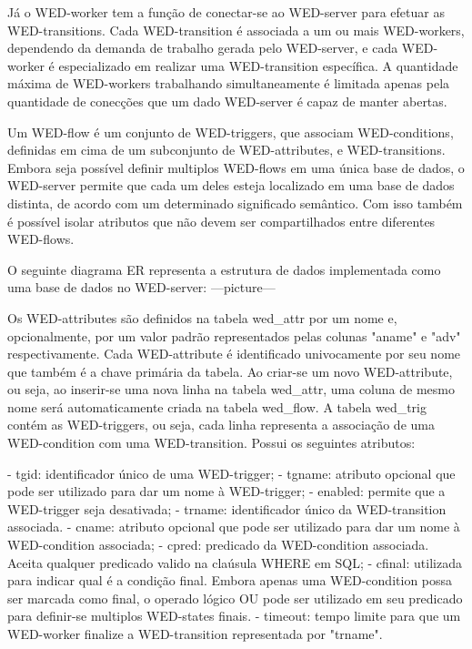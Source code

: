   Já o WED-worker tem a função de conectar-se ao WED-server para efetuar as WED-transitions. Cada WED-transition é associada
a um ou mais WED-workers, dependendo da demanda de trabalho gerada pelo WED-server, e cada WED-worker é especializado
em realizar uma WED-transition específica. A quantidade máxima de WED-workers trabalhando simultaneamente é limitada
apenas pela quantidade de conecções que um dado WED-server é capaz de manter abertas.
  
  Um WED-flow é um conjunto de WED-triggers, que associam WED-conditions, definidas em cima de 
um subconjunto de WED-attributes, e WED-transitions.
  Embora seja possível definir multiplos WED-flows em uma única base de dados, o WED-server permite que cada um deles 
esteja localizado em uma base de dados distinta, de acordo com um determinado significado semântico. Com isso também é 
possível isolar atributos que não devem ser compartilhados entre diferentes WED-flows. 
  
  O seguinte diagrama ER representa a estrutura de dados implementada como uma base de dados no WED-server:
  ---picture---

  Os WED-attributes são definidos na tabela wed_attr por um nome e, opcionalmente, por um valor padrão representados 
pelas colunas "aname" e "adv" respectivamente. Cada WED-attribute é identificado univocamente por seu nome que também é 
a chave primária da tabela. Ao criar-se um novo WED-attribute, ou seja, ao inserir-se uma nova linha na tabela wed_attr, 
uma coluna de mesmo nome será automaticamente criada na tabela wed_flow.
  A tabela wed_trig contém as WED-triggers, ou seja, cada linha representa a associação de uma WED-condition com uma 
WED-transition. Possui os seguintes atributos:

  - tgid: identificador único de uma WED-trigger;
  - tgname: atributo opcional que pode ser utilizado para dar um nome à WED-trigger;
  - enabled: permite que a WED-trigger seja desativada;
  - trname: identificador único da WED-transition associada.
  - cname: atributo opcional que pode ser utilizado para dar um nome à WED-condition associada;
  - cpred: predicado da WED-condition associada. Aceita qualquer predicado valido na claúsula WHERE em SQL;
  - cfinal: utilizada para indicar qual é a condição final. Embora apenas uma WED-condition possa ser marcada como final,
           o operado lógico OU pode ser utilizado em seu predicado para definir-se multiplos WED-states finais.
  - timeout: tempo limite para que um WED-worker finalize a WED-transition representada por "trname".

